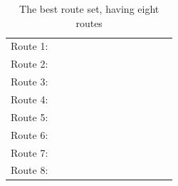 \begin{table}[H]
    \centering
    \begin{tabular}{|l|l l l l l l l l|}
    \hline
    Route 1: & ~ & ~ & ~ & ~ & ~ & ~ & ~ & ~ \\
    Route 2: & ~ & ~ & ~ & ~ & ~ & ~ & ~ & ~ \\
    Route 3: & ~ & ~ & ~ & ~ & ~ & ~ & ~ & ~ \\
    Route 4: & ~ & ~ & ~ & ~ & ~ & ~ & ~ & ~ \\
    Route 5: & ~ & ~ & ~ & ~ & ~ & ~ & ~ & ~ \\
    Route 6: & ~ & ~ & ~ & ~ & ~ & ~ & ~ & ~ \\
    Route 7: & ~ & ~ & ~ & ~ & ~ & ~ & ~ & ~ \\
    Route 8: & ~ & ~ & ~ & ~ & ~ & ~ & ~ & ~ \\
    \hline
    \end{tabular}
    \caption {The best route set, having eight routes}
    \label{table:performanceComparison_bestRouteSet8}
    \end{table}

